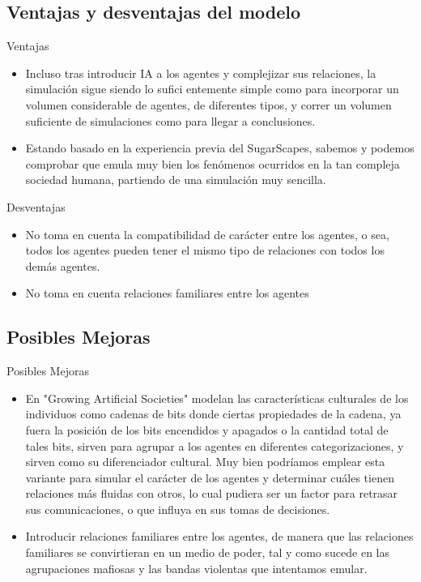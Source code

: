 \documentclass{beamer}
\begin{document}
\subsection{Ventajas y desventajas del modelo}
\begin{frame}{Ventajas}
  \begin{itemize}
    \item Incluso tras introducir IA a los agentes y complejizar sus relaciones, la simulación sigue siendo lo sufici
          entemente simple como para incorporar un volumen considerable de agentes, de diferentes tipos, y correr un volumen suficiente de simulaciones como para llegar a conclusiones.
    \item Estando basado en la experiencia previa del SugarScapes, sabemos y podemos comprobar que emula muy bien los fenómenos ocurridos en la tan compleja sociedad humana, partiendo de una simulación muy sencilla.
  \end{itemize}
\end{frame}

\begin{frame}{Desventajas}
  \begin{itemize}
    \item No toma en cuenta la compatibilidad de carácter entre los agentes, o sea, todos los agentes pueden tener el mismo tipo de relaciones con todos los demás agentes.
    \item No toma en cuenta relaciones familiares entre los agentes
  \end{itemize}
\end{frame}

\subsection{Posibles Mejoras}
\begin{frame}{Posibles Mejoras}
  \begin{itemize}
    \item En "Growing Artificial Societies" modelan las características culturales de los individuos como cadenas de bits donde ciertas propiedades de la cadena, ya fuera la posición de los bits encendidos y apagados o la cantidad total de tales bits, sirven para agrupar a los agentes en diferentes categorizaciones, y sirven como su diferenciador cultural. Muy bien podríamos emplear esta variante para simular el carácter de los agentes y determinar cuáles tienen relaciones más fluidas con otros, lo cual pudiera ser un factor para retrasar sus comunicaciones, o que influya en sus tomas de decisiones.
    \item Introducir relaciones familiares entre los agentes, de manera que las relaciones familiares se convirtieran en un medio de poder, tal y como sucede en las agrupaciones mafiosas y las bandas violentas que intentamos emular.
  \end{itemize}
\end{frame}
\end{document}

